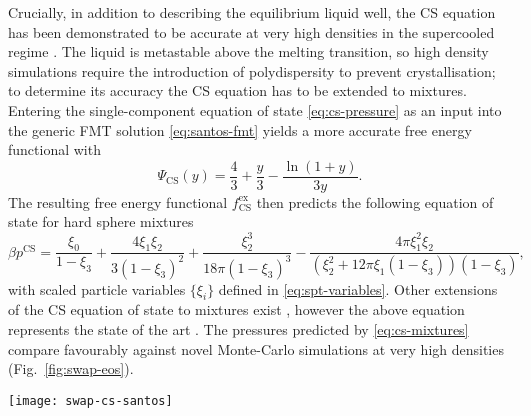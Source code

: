 Crucially, in addition to describing the equilibrium liquid well, the CS equation has been demonstrated to be accurate at very high densities in the supercooled regime \cite{BerthierPRL2016}.
The liquid is metastable above the melting transition, so high density simulations require the introduction of polydispersity %
to prevent crystallisation; to determine its accuracy the CS equation has to be extended to mixtures.
Entering the single-component equation of state \eqref{eq:cs-pressure} as an input into the generic FMT solution \eqref{eq:santos-fmt} yields a more accurate free energy functional with \cite{SantosPRE2012}
\begin{equation}\label{eq:cs-fmt}
  \Psi_\mathrm{CS}(y)
  =
  \frac{4}{3} + \frac{y}{3} - \frac{\ln{(1 + y)}}{3y}.
\end{equation}
The resulting free energy functional $f^\mathrm{ex}_\mathrm{CS}$ then predicts the following equation of state for hard sphere mixtures \cite{SantosPRE2012}
\begin{equation}\label{eq:cs-mixtures}
  \beta p^\mathrm{CS}
  =
  \frac{\xi_0}{1 - \xi_3}
  + \frac{4 \xi_1 \xi_2}{3 (1 - \xi_3)^2}
  + \frac{\xi_2^3}{18 \pi (1 - \xi_3)^3}
  - \frac{4 \pi \xi_1^2 \xi_2}{(\xi_2^2 + 12\pi \xi_1 (1 - \xi_3)) (1 - \xi_3)},
\end{equation}
with scaled particle variables $\{\xi_i\}$ defined in \eqref{eq:spt-variables}.
Other extensions of the CS equation of state to mixtures exist%
,
however the above equation represents the state of the art \cite{SantosPRE2012}.
The pressures predicted by \eqref{eq:cs-mixtures} compare favourably against novel Monte-Carlo simulations at very high densities (Fig.\ \ref{fig:swap-eos}).

\begin{SCfigure}
  \texttt{[image: swap-cs-santos]}
  \caption[Accuracy of Carnahan-Starling equation at high densities]{
    Accuracy of empirical Carnahan-Starling (CS) equation of state \eqref{eq:cs-mixtures} in the supercooled regime from comparison with novel Monte-Carlo (MC) simulations for a system with 23\% polydispersity.
    The range of jamming volume fractions $\eta_J$ from non-equilibrium compression protocols with this system are indicated by the blue region.
    Simulation data and jamming densities reproduced from Ref.\ \cite{BerthierPRL2016}.
  }
  \label{fig:swap-eos}
\end{SCfigure}

